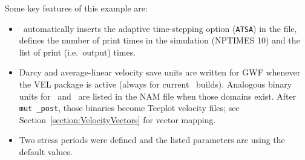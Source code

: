 Some key features of this example are:
\begin{itemize}
    \item \mut\ automatically inserts the adaptive time-stepping option (\texttt{ATSA}) in the file, defines the number of print times in the simulation (NPTIMES 10) and the list of print (i.e.\ output) times.
    \item Darcy and average-linear velocity save units are written for GWF whenever the VEL package is active (always for current \mut\ builds). Analogous binary units for \cln\ and \swf\ are listed in the NAM file when those domains exist. After {\tt mut \_post}, those binaries become Tecplot velocity files; see Section~\ref{section:VelocityVectors} for vector mapping.
    \item Two stress periods were defined and the listed parameters are using the default values.
\end{itemize}

